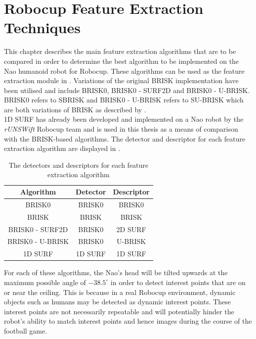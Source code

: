 \chapter{Robocup Feature Extraction Techniques}
\label{sec:realtimeFeatureExtraction}
This chapter describes the main feature extraction algorithms that are to be compared in order to determine the best algorithm to be implemented on the Nao humanoid robot for Robocup. These algorithms can be used as the feature extraction module in . Variations of the original BRISK implementation \citep{Leutenegger2011} have been utilised and include BRISK0, BRISK0 - SURF2D and BRISK0 - U-BRISK. BRISK0 refers to SBRISK and BRISK0 - U-BRISK refers to SU-BRISK which are both variations of BRISK as described by \citet{Leutenegger2011}.\\

1D SURF has already been developed and implemented on a Nao robot by the \textit{rUNSWift} Robocup team \citep{Anderson} and is used in this thesis as a means of comparison with the BRISK-based algorithms. The detector and descriptor for each feature extraction algorithm are displayed in .\\

\begin{table}
\centering
\caption{The detectors and descriptors for each feature extraction algorithm}
\begin{tabular}{|c|c|c|}
\hline 
Algorithm & Detector & Descriptor\tabularnewline
\hline 
\hline 
BRISK0 & BRISK0 & BRISK0\tabularnewline
\hline 
BRISK & BRISK & BRISK\tabularnewline
\hline 
BRISK0 - SURF2D & BRISK0 & 2D SURF\tabularnewline
\hline 
BRISK0 - U-BRISK & BRISK0 & U-BRISK\tabularnewline
\hline 
1D SURF & 1D SURF & 1D SURF\tabularnewline
\hline 
\end{tabular}
\label{tab:detector_descriptor}
\end{table}


For each of these algorithms, the Nao's head will be tilted upwards at the maximum possible angle of $-38.5^{\circ}$ \citep{NaoHead} in order to detect interest points that are on or near the ceiling. This is because in a real Robocup environment, dynamic objects such as humans may be detected as dynamic interest points. These interest points are not necessarily repeatable and will potentially hinder the robot's  ability to match interest points and hence images during the course of the football game.\\

